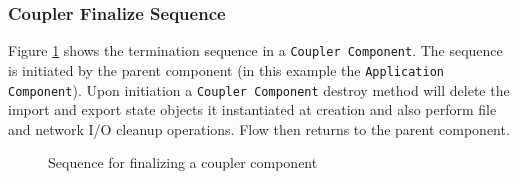 \subsubsection{Coupler Finalize Sequence}
Figure \ref{fig:CouplerFinalizeSequence} shows the termination sequence in
a {\tt  Coupler Component}. The sequence is initiated by the parent 
component (in this example the {\tt Application Component}). Upon 
initiation a {\tt Coupler Component} destroy method will delete
the import and export state objects it instantiated at creation and
also perform file and network I/O cleanup operations.
Flow then returns to the parent component.
\begin{figure}
\caption[{Coupler Finalize}]{Sequence for finalizing a coupler component}
\begin{center}
\label{fig:CouplerFinalizeSequence}
\end{center}
\end{figure}

